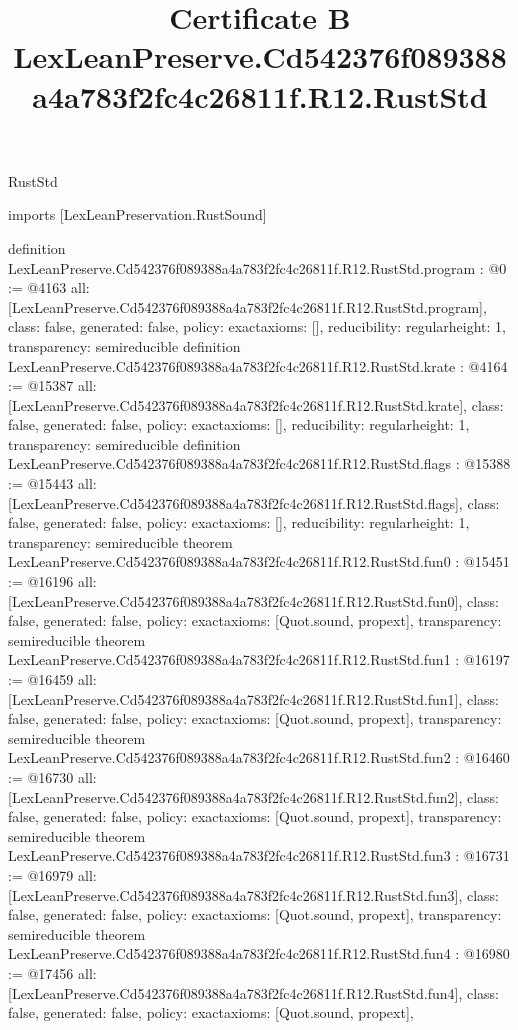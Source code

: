 \begin{lexlean}{RustStd}
\title{Certificate B LexLeanPreserve.Cd542376f089388a4a783f2fc4c26811f.R12.RustStd}
\begin{coremodule}
imports [LexLeanPreservation.RustSound]

definition LexLeanPreserve.Cd542376f089388a4a783f2fc4c26811f.R12.RustStd.program : @0 := @4163 {
  all: [LexLeanPreserve.Cd542376f089388a4a783f2fc4c26811f.R12.RustStd.program],
  class: false,
  generated: false,
  policy: exact{axioms: []},
  reducibility: regular{height: 1},
  transparency: semireducible
}
definition LexLeanPreserve.Cd542376f089388a4a783f2fc4c26811f.R12.RustStd.krate : @4164 := @15387 {
  all: [LexLeanPreserve.Cd542376f089388a4a783f2fc4c26811f.R12.RustStd.krate],
  class: false,
  generated: false,
  policy: exact{axioms: []},
  reducibility: regular{height: 1},
  transparency: semireducible
}
definition LexLeanPreserve.Cd542376f089388a4a783f2fc4c26811f.R12.RustStd.flags : @15388 := @15443 {
  all: [LexLeanPreserve.Cd542376f089388a4a783f2fc4c26811f.R12.RustStd.flags],
  class: false,
  generated: false,
  policy: exact{axioms: []},
  reducibility: regular{height: 1},
  transparency: semireducible
}
theorem LexLeanPreserve.Cd542376f089388a4a783f2fc4c26811f.R12.RustStd.fun0 : @15451 := @16196 {
  all: [LexLeanPreserve.Cd542376f089388a4a783f2fc4c26811f.R12.RustStd.fun0],
  class: false,
  generated: false,
  policy: exact{axioms: [Quot.sound, propext]},
  transparency: semireducible
}
theorem LexLeanPreserve.Cd542376f089388a4a783f2fc4c26811f.R12.RustStd.fun1 : @16197 := @16459 {
  all: [LexLeanPreserve.Cd542376f089388a4a783f2fc4c26811f.R12.RustStd.fun1],
  class: false,
  generated: false,
  policy: exact{axioms: [Quot.sound, propext]},
  transparency: semireducible
}
theorem LexLeanPreserve.Cd542376f089388a4a783f2fc4c26811f.R12.RustStd.fun2 : @16460 := @16730 {
  all: [LexLeanPreserve.Cd542376f089388a4a783f2fc4c26811f.R12.RustStd.fun2],
  class: false,
  generated: false,
  policy: exact{axioms: [Quot.sound, propext]},
  transparency: semireducible
}
theorem LexLeanPreserve.Cd542376f089388a4a783f2fc4c26811f.R12.RustStd.fun3 : @16731 := @16979 {
  all: [LexLeanPreserve.Cd542376f089388a4a783f2fc4c26811f.R12.RustStd.fun3],
  class: false,
  generated: false,
  policy: exact{axioms: [Quot.sound, propext]},
  transparency: semireducible
}
theorem LexLeanPreserve.Cd542376f089388a4a783f2fc4c26811f.R12.RustStd.fun4 : @16980 := @17456 {
  all: [LexLeanPreserve.Cd542376f089388a4a783f2fc4c26811f.R12.RustStd.fun4],
  class: false,
  generated: false,
  policy: exact{axioms: [Quot.sound, propext]},
}
\end{coremodule}
\end{lexlean}

